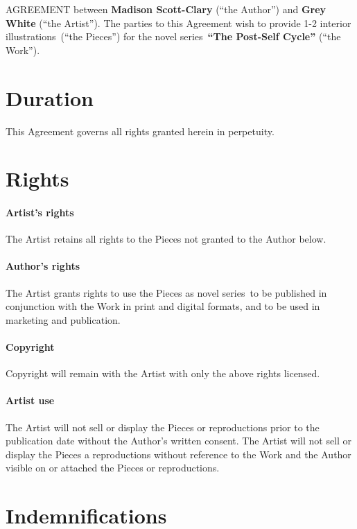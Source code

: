 \documentclass[12pt,letterpaper]{article}
\def\WorkTitle{The Post-Self Cycle}
\def\WorkAuthor{Madison Scott-Clary}
\def\WorkType{novel series}
\def\Artist{Grey White}
\def\ArtType{1-2 interior illustrations}
\begin{document}
\Form

\noindent AGREEMENT between \textbf{\WorkAuthor} (``the Author'') and \textbf{\Artist} (``the Artist''). The parties to this Agreement wish to provide \ArtType\ (``the Pieces'') for the \WorkType\ \textbf{``\WorkTitle''} (``the Work'').

\section{Duration}

This Agreement governs all rights granted herein in perpetuity.

\section{Rights}

\paragraph{Artist's rights}

The Artist retains all rights to the Pieces not granted to the Author below.

\paragraph{Author's rights}

The Artist grants rights to use the Pieces as \WorkType\ to be published in conjunction with the Work in print and digital formats, and to be used in marketing and publication.

\paragraph{Copyright}

Copyright will remain with the Artist with only the above rights licensed.

\paragraph{Artist use}

The Artist will not sell or display the Pieces or reproductions prior to the publication date without the Author's written consent. The Artist will not sell or display the Pieces a reproductions without reference to the Work and the Author visible on or attached the Pieces or reproductions.

\section{Indemnifications}
\end{document}
